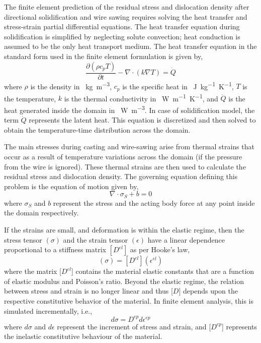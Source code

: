 The finite element prediction of the residual stress and dislocation density after directional solidification and wire sawing requires solving the heat transfer and stress-strain partial differential equations. The heat transfer equation during solidification is simplified by neglecting solute convection;  heat conduction is assumed to be the only heat transport medium. The heat transfer equation in the standard form used in the finite element formulation is given by,
\begin{equation}
   \frac{\partial(\rho c_{p} T)}{\partial t} 
   - \nabla\cdot(k\nabla T)
   = \dot{Q}
   \label {heat_eq}
\end{equation}
\newline
where $\rho$ is the density in \SI{}{kg.m^{-3}}, $c_{p}$ is the specific heat in \SI{}{J.kg^{-1}.K^{-1}}, $T$ is the temperature, $k$ is the thermal conductivity in \SI{}{W.m^{-1}.K^{-1}}, and $\dot{Q}$ is the heat generated inside the domain in \SI{}{W. m^{-3}}. In case of solidification model, the term $\dot{Q}$ represents the latent heat. This equation is discretized and then solved to obtain the temperature-time distribution across the domain. 

The main stresses during casting and wire-sawing arise from thermal strains that occur as a result of temperature variations across the domain (if the pressure from the wire is ignored). These thermal strains are then used to calculate the residual stress and dislocation density. The governing equation defining this problem is the equation of motion given by,
\begin{equation}
  \nabla^{}\cdot\sigma_{S} + b
   = 0
   \label {continuity_eq}
\end{equation}
where $\sigma_{S}$ and $b$ represent the stress and the acting body force at any point inside the domain respectively. 

If the strains are small, and deformation is within the elastic regime, then the stress tensor $(\sigma)$ and the strain tensor $(\epsilon)$ have a linear dependence proportional to a stiffness matrix $[D^{el}]$ as per Hooke's law, 
\begin{equation}
  (\sigma)
   = [D^{el}] (\epsilon^{el})
   \label {Hookes_law}
\end{equation}
where the matrix [$D^{el}$] contains the material elastic constants that are a function of elastic modulus and Poisson’s ratio. Beyond the elastic regime, the relation between stress and strain is no longer linear and thus [$D$] depends upon the respective constitutive behavior of the material. In finite element analysis, this is simulated incrementally, i.e.,
\begin{equation}
  d\sigma
   = D^{ep} d\epsilon^{ep}
   \label {Hookes_law_partial}
\end{equation}
where $d\sigma$ and $d\epsilon$ represent the increment of stress and strain, and [$D^{ep}$] represents the inelastic constitutive behaviour of the material.

